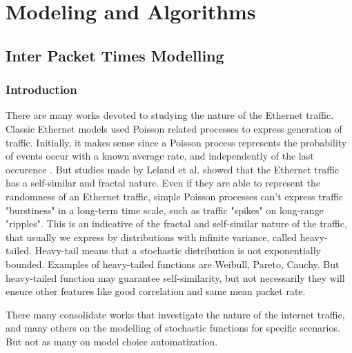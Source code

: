 \chapter{Modeling and Algorithms}\label{ch:modeling-evaluation}


\section{Inter Packet Times Modelling}

\subsection{Introduction}

There are many works devoted to studying the nature of the Ethernet traffic\cite{selfsimilar-ethernet}. Classic Ethernet models used Poisson related processes to express generation of traffic. Initially, it makes sense since a Poisson process represents the probability of events occur with a known average rate, and independently of the last occurence\cite{selfsimilar-ethernet} \cite{book-poisson}. But studies made by Leland et al.\cite{selfsimilar-ethernet} showed that the Ethernet traffic has a self-similar and fractal nature. Even if they are able to represent the randomness of an Ethernet traffic, simple Poisson processes can't express traffic "burstiness" in a long-term time scale, such as traffic "spikes" on long-range "ripples". This is an indicative of the fractal and self-similar nature of the traffic, that usually we express by distributions with infinite variance, called heavy-tailed. Heavy-tail means that a stochastic distribution is not exponentially bounded\cite{sourcesonoff-paper}. Examples of heavy-tailed functions are Weibull, Pareto, Cauchy.  But heavy-tailed function may guarantee self-similarity, but not necessarily they will ensure other features like good correlation and same mean packet rate.

There many consolidate works that investigate the nature of the internet traffic\cite{selfsimilar-ethernet}\cite{analysis-self-similar}\cite{stochartic-selfsimilar}\cite{selfsimilar-highvariability}\cite{multi-player-online-game-self-similarity}, and many others on the modelling of stochastic functions for specific scenarios\cite{estimation-renewal-function-ethernet-traffic}\cite{modelling-of-self-similar}\cite{empirical-interarrival-study}\cite{modeling-concurrent-heavy-tailed}\cite{optimal-scheduling-of-heavy-tailed-traffic}\cite{modelling-of-self-similar}. But not as many on model choice automatization\cite{sourcesonoff-paper}.

